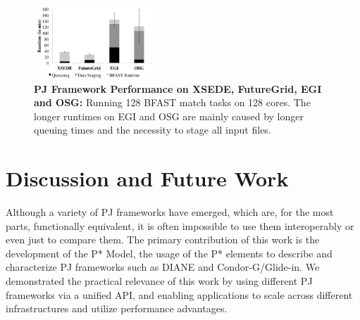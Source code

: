\documentclass{sig-alternate}
\begin{document}
 
\begin{figure}[t]
	\upp
\centering
\includegraphics[width=0.4\textwidth]{perf/interop/128-bfast-egi-fg-xsede-osg.pdf}
\caption{\textbf{PJ Framework Performance on XSEDE, FutureGrid, EGI and 
  OSG:} Running 128 BFAST match tasks on 128 cores. The longer runtimes on EGI 
  and OSG are mainly caused by  longer queuing times and the necessity to   stage all input files. }\upp\upp\upp
  \label{fig:perf_perf-bfast-bj}
\end{figure}


\section{Discussion and Future Work} 
\label{sec:discussion-future-work}

Although a variety of PJ frameworks have emerged, which are, for the
most parts, functionally equivalent, it is often impossible to use
them interoperably or even just to compare them. The primary
contribution of this work is the development of the P* Model, the
usage of the P* elements to describe and characterize PJ frameworks
such as DIANE and Condor-G/Glide-in.  We demonstrated the practical
relevance of this work by using different PJ frameworks via a unified
API, and enabling applications to scale across different
infrastructures and utilize performance advantages.
\end{document}
